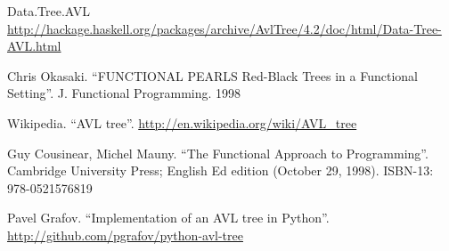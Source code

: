 \documentclass[b5paper]{article}
\begin{document}
\ifx\wholebook\relax \else
\begin{thebibliography}{99}

Data.Tree.AVL \url{http://hackage.haskell.org/packages/archive/AvlTree/4.2/doc/html/Data-Tree-AVL.html}

Chris Okasaki. ``FUNCTIONAL PEARLS Red-Black Trees in a Functional Setting''. J. Functional Programming. 1998

Wikipedia. ``AVL tree''. \url{http://en.wikipedia.org/wiki/AVL_tree}

Guy Cousinear, Michel Mauny. ``The Functional Approach to Programming''. Cambridge University Press; English Ed edition (October 29, 1998). ISBN-13: 978-0521576819

Pavel Grafov. ``Implementation of an AVL tree in Python''. \url{http://github.com/pgrafov/python-avl-tree}

\end{thebibliography}

\expandafter\enddocument
\fi
\end{document}
